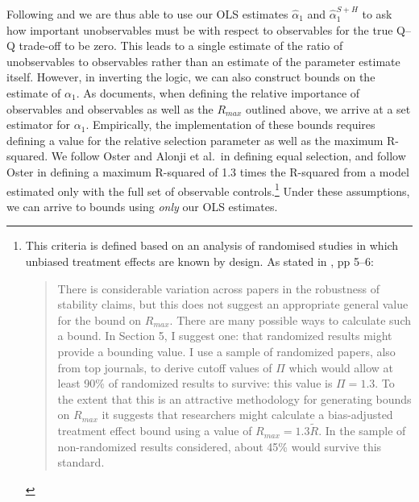 \documentclass[subeqn]{article}
\begin{document}
\begin{spacing}{1.4}
Following \citet{Altonjietal2005} and \citet{Oster2013} we are thus able to use our OLS estimates $\hat\alpha_1$ and $\hat\alpha_1^{S+H}$ to ask how important unobservables must be with respect to observables for the true Q--Q trade-off to be zero.  This leads to a single estimate of the ratio of unobservables to observables rather than an estimate of the parameter estimate itself.  However, in inverting the logic, we can also construct bounds on the estimate of $\alpha_1$.  As \citet{Oster2013} documents, when defining the relative importance of observables and observables as well as the $R_{max}$ outlined above, we arrive at a set estimator for $\alpha_1$.  Empirically, the implementation of these bounds requires defining a value for the relative selection parameter as well as the maximum R-squared.  We follow Oster and Alonji et al.\ in defining equal selection, and follow Oster in defining a maximum R-squared of 1.3 times the R-squared from a model estimated only with the full set of observable controls.\footnote{This criteria is defined based on an analysis of randomised studies in which unbiased treatment effects are known by design.  As stated in \citet{Oster2013}, pp 5--6: \begin{quote}
    There is considerable variation across papers in the robustness of stability claims, but this does not suggest an appropriate general value for the bound on $R_{max}$. There are many possible ways to calculate such a bound.  In Section 5, I suggest one:  that randomized results might provide a bounding value.  I use a sample of randomized papers, also from top journals, to derive cutoff  values of $\Pi$ which would allow at least 90\% of randomized results to survive: this value is $\Pi = 1.3$.  To the extent that this is an attractive methodology for generating bounds on $R_{max}$ it suggests that researchers might calculate a bias-adjusted treatment effect bound using a value of $R_{max} = 1.3\tilde{R}$. In the sample of non-randomized results considered, about 45\% would survive this standard.
  \end{quote}
} Under these assumptions, we can arrive to bounds using \emph{only} our OLS estimates.


\end{spacing}
\end{document}
